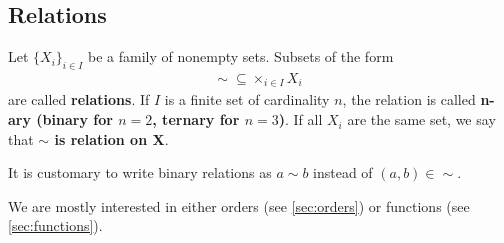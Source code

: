 \subsection{Relations}\label{sec:relations}

\begin{definition}\label{def:relation}
  Let \( \{ X_i \}_{i \in I} \) be a family of nonempty sets.
  Subsets of the form
  \begin{align*}
    \sim\; \subseteq \times_{i \in I} X_i
  \end{align*}
  are called \textbf{relations}. If \( I \) is a finite set of cardinality \( n \), the relation is called \textbf{n-ary (binary for \( n = 2 \), ternary for \( n = 3 \))}. If all \( X_i \) are the same set, we say that \textbf{\( \sim \) is relation on X}.

  It is customary to write binary relations as \( a \sim b \) instead of \( (a, b) \in \sim \).
\end{definition}

\begin{note}\label{note:main_relation_types}
  We are mostly interested in either orders (see \cref{sec:orders}) or functions (see \cref{sec:functions}).
\end{note}

